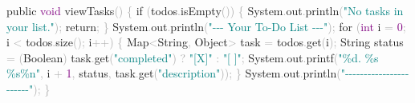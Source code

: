 \documentclass[
  justified,
  openright,
]{tufte-book}
\newcommand{\BuiltInTok}[1]{#1}
\newcommand{\ControlFlowTok}[1]{\textcolor{BrandBlue}{#1}}
\newcommand{\DataTypeTok}[1]{\textcolor{Purple}{#1}}
\newcommand{\DecValTok}[1]{\textcolor{Purple}{#1}}
\newcommand{\FunctionTok}[1]{\textcolor{BrandBlue}{#1}}
\newcommand{\KeywordTok}[1]{\textcolor{BrandBlue}{#1}}
\newcommand{\NormalTok}[1]{#1}
\newcommand{\OperatorTok}[1]{\textcolor{DarkGray}{#1}}
\newcommand{\SpecialCharTok}[1]{\textcolor{Teal}{#1}}
\newcommand{\StringTok}[1]{\textcolor{Teal}{#1}}
\newenvironment{Shaded}{%
  \begin{snugshade}
}{%
  \end{snugshade}
}
\begin{document}
\begin{Shaded}
\begin{Highlighting}[]
    \KeywordTok{public} \DataTypeTok{void} \FunctionTok{viewTasks}\OperatorTok{()} \OperatorTok{\{}
        \ControlFlowTok{if} \OperatorTok{(}\NormalTok{todos}\OperatorTok{.}\FunctionTok{isEmpty}\OperatorTok{())} \OperatorTok{\{}
            \BuiltInTok{System}\OperatorTok{.}\FunctionTok{out}\OperatorTok{.}\FunctionTok{println}\OperatorTok{(}\StringTok{"No tasks in your list."}\OperatorTok{);}
            \ControlFlowTok{return}\OperatorTok{;}
        \OperatorTok{\}}
        \BuiltInTok{System}\OperatorTok{.}\FunctionTok{out}\OperatorTok{.}\FunctionTok{println}\OperatorTok{(}\StringTok{"{-}{-}{-} Your To{-}Do List {-}{-}{-}"}\OperatorTok{);}
        \ControlFlowTok{for} \OperatorTok{(}\DataTypeTok{int}\NormalTok{ i }\OperatorTok{=} \DecValTok{0}\OperatorTok{;}\NormalTok{ i }\OperatorTok{\textless{}}\NormalTok{ todos}\OperatorTok{.}\FunctionTok{size}\OperatorTok{();}\NormalTok{ i}\OperatorTok{++)} \OperatorTok{\{}
            \BuiltInTok{Map}\OperatorTok{\textless{}}\BuiltInTok{String}\OperatorTok{,} \BuiltInTok{Object}\OperatorTok{\textgreater{}}\NormalTok{ task }\OperatorTok{=}\NormalTok{ todos}\OperatorTok{.}\FunctionTok{get}\OperatorTok{(}\NormalTok{i}\OperatorTok{);}
            \BuiltInTok{String}\NormalTok{ status }\OperatorTok{=} \OperatorTok{(}\BuiltInTok{Boolean}\OperatorTok{)}\NormalTok{ task}\OperatorTok{.}\FunctionTok{get}\OperatorTok{(}\StringTok{"completed"}\OperatorTok{)} \OperatorTok{?} \StringTok{"[X]"} \OperatorTok{:} \StringTok{"[ ]"}\OperatorTok{;}
            \BuiltInTok{System}\OperatorTok{.}\FunctionTok{out}\OperatorTok{.}\FunctionTok{printf}\OperatorTok{(}\StringTok{"}\SpecialCharTok{\%d}\StringTok{. }\SpecialCharTok{\%s}\StringTok{ }\SpecialCharTok{\%s\%n}\StringTok{"}\OperatorTok{,}\NormalTok{ i }\OperatorTok{+} \DecValTok{1}\OperatorTok{,}\NormalTok{ status}\OperatorTok{,}\NormalTok{ task}\OperatorTok{.}\FunctionTok{get}\OperatorTok{(}\StringTok{"description"}\OperatorTok{));}
        \OperatorTok{\}}
        \BuiltInTok{System}\OperatorTok{.}\FunctionTok{out}\OperatorTok{.}\FunctionTok{println}\OperatorTok{(}\StringTok{"{-}{-}{-}{-}{-}{-}{-}{-}{-}{-}{-}{-}{-}{-}{-}{-}{-}{-}{-}{-}{-}{-}{-}"}\OperatorTok{);}
    \OperatorTok{\}}


\end{Highlighting}
\end{Shaded}
\end{document}
